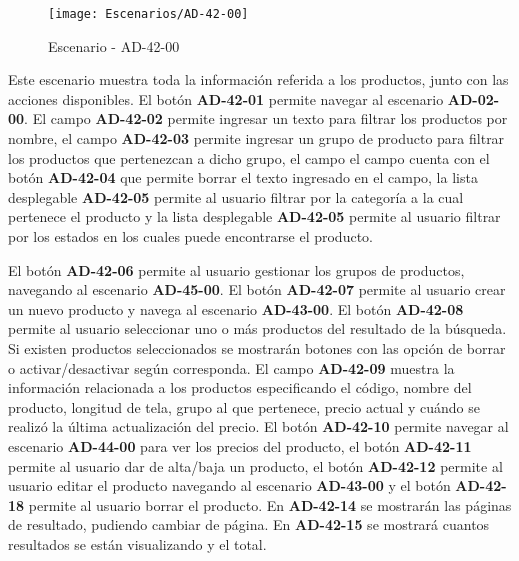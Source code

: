 \begin{figure}[H]
\centering
\texttt{[image: Escenarios/AD-42-00]}
\caption{Escenario - AD-42-00}
\label{fig:AD-42-00}
\end{figure}

Este escenario muestra toda la información referida a los productos, junto con las acciones disponibles.
El botón \textbf{AD-42-01} permite navegar al escenario \textbf{AD-02-00}. El campo \textbf{AD-42-02} permite ingresar un texto para filtrar los productos por nombre, el campo \textbf{AD-42-03} permite ingresar un grupo de producto para filtrar los productos que pertenezcan a dicho grupo, el campo el campo cuenta con el botón \textbf{AD-42-04} que permite borrar el texto ingresado en el campo, la lista desplegable \textbf{AD-42-05} permite al usuario filtrar por la categoría a la cual pertenece el producto y la lista desplegable \textbf{AD-42-05} permite al usuario filtrar por los estados en los cuales puede encontrarse el producto.

El botón \textbf{AD-42-06} permite al usuario gestionar los grupos de productos, navegando al escenario \textbf{AD-45-00}. El botón \textbf{AD-42-07} permite al usuario crear un nuevo producto y navega al escenario \textbf{AD-43-00}.
El botón \textbf{AD-42-08} permite al usuario seleccionar uno o más productos del resultado de la búsqueda. Si existen productos seleccionados se mostrarán botones con las opción de borrar o activar/desactivar según corresponda. El campo \textbf{AD-42-09} muestra la información relacionada a los productos especificando el código, nombre del producto, longitud de tela, grupo al que pertenece, precio actual y cuándo se realizó la última actualización del precio. El botón \textbf{AD-42-10} permite navegar al escenario \textbf{AD-44-00} para ver los precios del producto, el botón \textbf{AD-42-11} permite al usuario dar de alta/baja un producto, el botón \textbf{AD-42-12} permite al usuario editar el producto navegando al escenario \textbf{AD-43-00} y el botón \textbf{AD-42-18} permite al usuario borrar el producto. 
En \textbf{AD-42-14} se mostrarán las páginas de resultado, pudiendo cambiar de página. En \textbf{AD-42-15} se mostrará cuantos resultados se están visualizando y el total.
\clearpage
